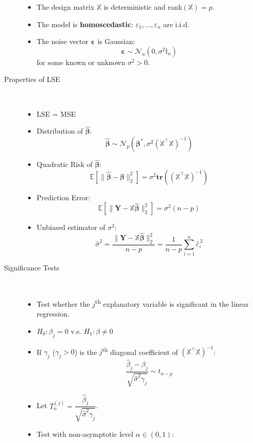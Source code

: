 \documentclass[a4paper, 10pt,landscape]{article}
\begin{document}
\begin{multicols*}{3}
\begin{description}
	\begin{itemize}
		\item The design matrix $\mathbb{X}$ is deterministic and rank$(\mathbb{X})=p$.
		\item The model is {\bf homoscedastic}: $\varepsilon_1,\dots,\varepsilon_n$ are i.i.d.
		\item The noise vector $\boldsymbol{\varepsilon}$ is Gaussian:
		$$\boldsymbol{\varepsilon}\sim\mathcal{N}_n\left(0,\sigma^2\mathbb{I}_n\right)$$
		for some known or unknown $\sigma^2>0$.
	\end{itemize}
	\item[Properties of LSE] ~
	\begin{itemize}
		\item LSE = MSE
		\item Distribution of $\widehat{\boldsymbol{\beta}}$:
		$$\widehat{\boldsymbol{\beta}}\sim\mathcal{N}_p\left(\boldsymbol{\beta}^*,\sigma^2\left(\mathbb{X}^\intercal\mathbb{X}\right)^{-1}\right)$$
		\item Quadratic Risk of $\widehat{\boldsymbol{\beta}}$:
		$$\mathbb{E}\left[\lVert\widehat{\boldsymbol{\beta}}-\boldsymbol{\beta}\rVert_2^2\right]=\sigma^2\textbf{tr}\left(\left(\mathbb{X}^\intercal\mathbb{X}\right)^{-1}\right)$$
		\item Prediction Error:
		$$\mathbb{E}\left[\lVert\mathbf{Y}-\mathbb{X}\widehat{\boldsymbol{\beta}}\rVert_2^2\right]=\sigma^2\left(n-p\right)$$
		\item Unbiased estimator of $\sigma^2$:
		$$\widehat{\sigma}^2=\dfrac{\lVert\mathbf{Y}-\mathbb{X}\widehat{\boldsymbol{\beta}}\rVert_2^2}{n-p}=\dfrac{1}{n-p}\sum_{i=1}^{n}\widehat{\varepsilon}_i^{\,2}$$
	\end{itemize}
	\item[Significance Tests] ~
	\begin{itemize}
		\item Test whether the $j$\textsuperscript{th} explanatory variable is significant in the linear regression.
		\item $H_0:\beta_j=0$ v.s. $H_1:\beta\neq0$
		\item If $\gamma_j$ ($\gamma_j>0$) is the $j$\textsuperscript{th} diagonal coefficient of $\left(\mathbb{X}^\intercal\mathbb{X}\right)^{-1}$:
		$$\dfrac{\widehat{\beta}_j-\beta_j}{\sqrt{\widehat{\sigma}^2\gamma_j}}\sim t_{n-p}$$
		\item Let $T_n^{(j)}=\dfrac{\widehat{\beta}_j}{\sqrt{\widehat{\sigma}^2\gamma_j}}$.
		\item Test with non-asymptotic level $\alpha\in(0,1)$:

\end{itemize}
\end{description}
\end{multicols*}
\end{document}
